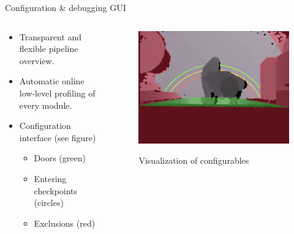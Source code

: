 \documentclass[final,hyperref={pdfpagelabels=false}]{beamer}
\begin{document}
\begin{frame}[t]
\begin{columns}[t]
\begin{column}{.465\textwidth}

\begin{block}{Configuration \& debugging GUI}

\begin{columns} %
\begin{column}{.54\textwidth} %

\begin{itemize}
\item Transparent and flexible pipeline overview.
\item Automatic online low-level profiling of every module.
\item Configuration interface (see figure)

\begin{itemize}
\item Doors (green)
\item Entering checkpoints (circles)
\item Exclusions (red)
\end{itemize}
\end{itemize}

\end{column}

\begin{column}{.43\textwidth} %
\centering
\begin{figure}
\includegraphics[width=0.985\linewidth]{PosterConfigCrop.png}
\label{fig:Config}
\caption{Visualization of configurables}
\end{figure}
\end{column}
\end{columns} %


\end{block}
\end{column}
\end{columns}
\end{frame}
\end{document}
